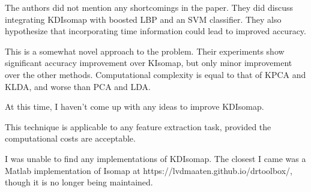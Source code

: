 \documentclass[11pt]{article}
\begin{document}
\begin{description}[leftmargin=0in]
    \item [Shortcomings] The authors did not mention any shortcomings in the
        paper. They did discuss integrating KDIsomap with boosted LBP and an SVM
        classifier. They also hypothesize that incorporating time information
        could lead to improved accuracy.

    \item [Self Evaluation] This is a somewhat novel approach to the problem.
        Their experiments show significant accuracy improvement over KIsomap,
        but only minor improvement over the other methods. Computational
        complexity is equal to that of KPCA and KLDA, and worse than PCA and
        LDA.

    \item [Improvements] At this time, I haven't come up with any ideas to
        improve KDIsomap.

    \item [Applications] This technique is applicable to any feature extraction
        task, provided the computational costs are acceptable.

    \item [Packages] I was unable to find any implementations of KDIsomap. The
        closest I came was a Matlab implementation of Isomap at
        https://lvdmaaten.github.io/drtoolbox/, though it is no longer being
        maintained.
\end{description}
\end{document}
